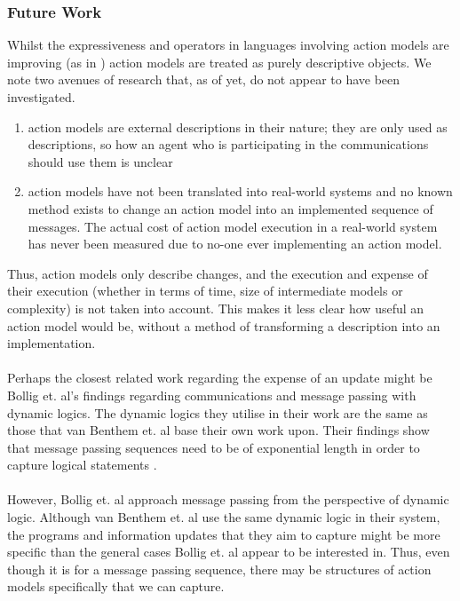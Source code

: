 \documentclass[12pt, a4paper, titlepage]{scrartcl}
\begin{document}
\subsubsection{Future Work}
Whilst the expressiveness and operators in languages involving action models are
improving (as in \cite{benthem2006lcc}) action models are treated as purely
descriptive objects.
We note two avenues of research that, as of yet, do not appear to have been
investigated.
\begin{enumerate}
	\item action models are external descriptions in their nature; they are only used as
	descriptions, so how an agent who is participating in the communications
	should use them is unclear
	\item action models have not been translated into real-world systems and no
	known method exists to change an action model into an implemented sequence of
	messages. The actual cost of action model execution in a real-world system has
	never been measured due to no-one ever implementing an action model.
\end{enumerate}
Thus, action models only describe changes, and the execution and expense
of their execution (whether in terms of time, size of intermediate models or
complexity) is not taken into account.
This makes it less clear how useful an action model would be, without a method
of transforming a description into an implementation.\\
\\
Perhaps the closest related work regarding the expense of an update might be
Bollig et. al's findings regarding communications and message passing with
dynamic logics.
The dynamic logics they utilise in their work are the same as those that van
Benthem et. al base their own work upon.
Their findings show that message passing sequences need to be of exponential
length in order to capture logical statements \cite{bollig07mps}.\\
\\
However, Bollig et. al approach message passing from the perspective of dynamic
logic.
Although van Benthem et. al use the same dynamic logic in their system, the
programs and information updates that they aim to capture might be more specific
than the general cases Bollig et. al appear to be interested in.
Thus, even though it is for a message passing sequence, there may be
structures of action models specifically that we can capture.\\
\end{document}
